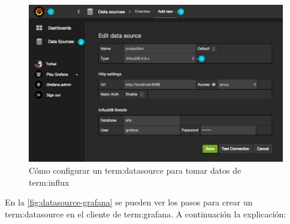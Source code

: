 \begin{figure}
  \includegraphics[width=\linewidth]{src/images/05-capitulo-5/datasource-grafana.jpg}
  \caption{Cómo configurar un \gls{term:datasource} para tomar datos de \gls{term:influx}}
  \label{fig:datasource-grafana}
\end{figure}

En la \autoref{fig:datasource-grafana} se pueden ver los pasos para crear un
\gls{term:datasource} en el cliente  de \gls{term:grafana}. A
continuación la explicación:

